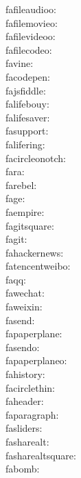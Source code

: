 fafileaudioo: {\FA \fafileaudioo} \\
fafilemovieo: {\FA \fafilemovieo} \\
fafilevideoo: {\FA \fafilevideoo} \\
fafilecodeo: {\FA \fafilecodeo} \\
favine: {\FA \favine} \\
facodepen: {\FA \facodepen} \\
fajsfiddle: {\FA \fajsfiddle} \\
falifebouy: {\FA \falifebouy} \\
falifesaver: {\FA \falifesaver} \\
fasupport: {\FA \fasupport} \\
falifering: {\FA \falifering} \\
facircleonotch: {\FA \facircleonotch} \\
fara: {\FA \fara} \\
farebel: {\FA \farebel} \\
fage: {\FA \fage} \\
faempire: {\FA \faempire} \\
fagitsquare: {\FA \fagitsquare} \\
fagit: {\FA \fagit} \\
fahackernews: {\FA \fahackernews} \\
fatencentweibo: {\FA \fatencentweibo} \\
faqq: {\FA \faqq} \\
fawechat: {\FA \fawechat} \\
faweixin: {\FA \faweixin} \\
fasend: {\FA \fasend} \\
fapaperplane: {\FA \fapaperplane} \\
fasendo: {\FA \fasendo} \\
fapaperplaneo: {\FA \fapaperplaneo} \\
fahistory: {\FA \fahistory} \\
facirclethin: {\FA \facirclethin} \\
faheader: {\FA \faheader} \\
faparagraph: {\FA \faparagraph} \\
fasliders: {\FA \fasliders} \\
fasharealt: {\FA \fasharealt} \\
fasharealtsquare: {\FA \fasharealtsquare} \\
fabomb: {\FA \fabomb} \\